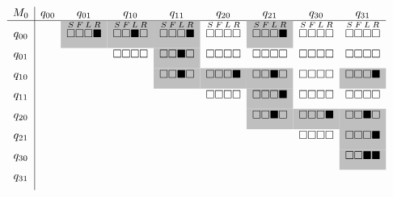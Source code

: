 \ensuremath{
  \begin{array}{c|cccccccc}
    M_0 & q_{00} & q_{01} & q_{10} & q_{11} & q_{20} & q_{21} & q_{30} & q_{31} \\ \hline
    q_{00}       &        &
    \cellcolor{lightgray}{\overset{S}{\ws}\overset{F}{\ws}\overset{L}{\ws}\overset{R}{\bs}} &
    \cellcolor{lightgray}{\overset{S}{\ws}\overset{F}{\ws}\overset{L}{\bs}\overset{R}{\ws}} &
    \cellcolor{lightgray}{\overset{S}{\ws}\overset{F}{\ws}\overset{L}{\ws}\overset{R}{\bs}} &
    \overset{S}{\ws}\overset{F}{\ws}\overset{L}{\ws}\overset{R}{\ws} &
    \cellcolor{lightgray}{\overset{S}{\ws}\overset{F}{\ws}\overset{L}{\ws}\overset{R}{\bs}} &
    \overset{S}{\ws}\overset{F}{\ws}\overset{L}{\ws}\overset{R}{\ws} &
    \overset{S}{\ws}\overset{F}{\ws}\overset{L}{\ws}\overset{R}{\ws} \\ [6pt]
    q_{01}       &        &              & \ws\ws\ws\ws & \cellcolor{lightgray}{\ws\ws\bs\ws} & \ws\ws\ws\ws & \ws\ws\ws\ws & \ws\ws\ws\ws & \ws\ws\ws\ws \\ [6pt]
    q_{10}       &        &              &              & \cellcolor{lightgray}{\ws\ws\bs\ws} & \cellcolor{lightgray}{\ws\ws\ws\bs} & \cellcolor{lightgray}{\ws\ws\bs\ws} & \ws\ws\ws\ws & \cellcolor{lightgray}{\ws\ws\ws\bs} \\ [6pt]
    q_{11}       &        &              &              &              & \ws\ws\ws\ws & \cellcolor{lightgray}{\ws\ws\ws\bs} & \ws\ws\ws\ws & \ws\ws\ws\ws \\ [6pt]
    q_{20}       &        &              &              &              &              & \cellcolor{lightgray}{\ws\ws\bs\ws} & \cellcolor{lightgray}{\ws\ws\ws\bs} & \cellcolor{lightgray}{\ws\ws\bs\ws} \\ [6pt]
    q_{21}       &        &              &              &              &              &              & \ws\ws\ws\ws & \cellcolor{lightgray}{\ws\ws\ws\bs} \\ [6pt]
    q_{30}       &        &              &              &              &              &              &              & \cellcolor{lightgray}{\ws\ws\bs\bs} \\ [6pt]
    q_{31}       &        &              &              &              &              &              &              &              \\ [6pt]
  \end{array}
}
